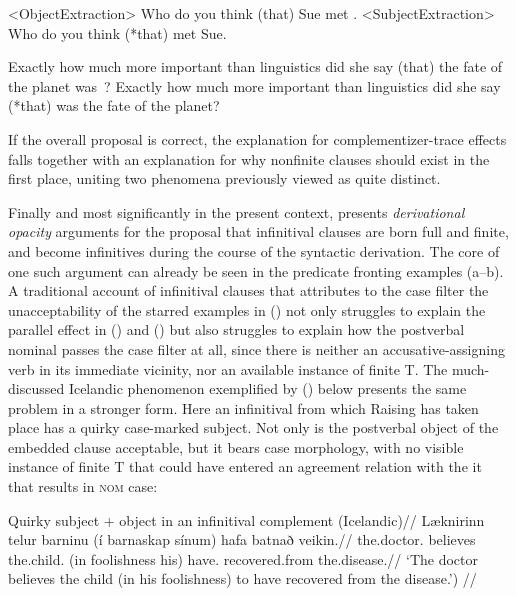 \documentclass[output=paper]{langscibook}
\begin{document}
\noindent {} 
\a<ObjectExtraction> Who do you think (that) Sue met \gap.
\a<SubjectExtraction> Who do you think (*that) \gap met Sue.

\smallskip
\a Exactly how much more important than linguistics did she say (that) the fate of the planet was~\gap? 
\a Exactly how much more important than linguistics did she say (*that) \gap was the fate of the planet? 
\xe

\noindent If the overall proposal is correct, the explanation for complementizer-trace effects falls together with an explanation for why nonfinite clauses should exist in the first place, uniting two phenomena previously viewed as quite distinct.

Finally and most significantly in the present context, \citet{Pesetsky:2019aa} presents \textit{derivational opacity} arguments for the proposal that infinitival clauses are born full and finite, and become infinitives during the course of the syntactic derivation. The core of one such argument can already be seen in the predicate fronting examples (a--b). A traditional account of infinitival clauses that attributes to the case filter the unacceptability of the starred examples in () not only struggles to explain the parallel effect in () and () but also struggles to explain how the postverbal nominal passes the case filter at all, since there is neither an accusative-assigning verb in its immediate vicinity, nor an available instance of finite T. The much-discussed Icelandic phenomenon exemplified by () below presents the same problem in a stronger form. Here an infinitival from which Raising has taken place has a quirky case-marked subject. Not only is the postverbal object of the embedded clause acceptable, but it bears \Nom{} case morphology, with no visible instance of finite T that could have entered an agreement relation with the it that results in \textsc{nom} case: 

\begingl
\glpreamble Quirky subject + \Nom{} object in an infinitival complement (Icelandic)//
\gla Læknirinn telur barninu (í barnaskap sínum) hafa batnað veikin.//
\glb the.doctor.\Nom{} believes the.child.\Dat{} (in foolishness his) have.\Inf{} recovered.from the.disease.\textbf{\Nom{}}//
\glft `The doctor believes the child  (in his foolishness)  to have recovered from the disease.') //
\endgl
\xe
\end{document}
